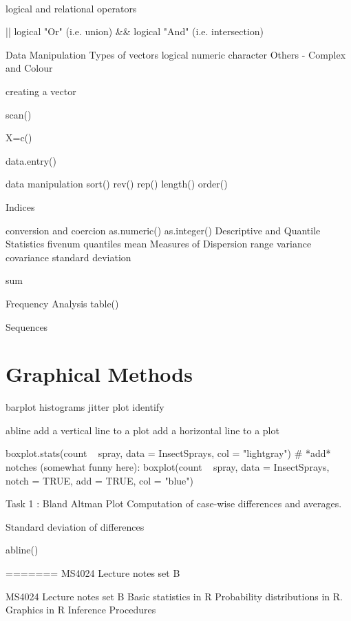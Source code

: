  \newpage



logical and relational operators
 
||      logical "Or"      (i.e.  union)
&&     logical "And"   (i.e. intersection)   

 



Data Manipulation
Types of vectors
	logical
	numeric
	character
    Others  - Complex and Colour

creating a vector

scan()

X=c()

data.entry()

data manipulation
sort()
rev()
rep()
length()
order()


Indices

 

 

 
conversion and coercion
as.numeric()
as.integer()
Descriptive and Quantile Statistics
fivenum
quantiles
mean
Measures of Dispersion
  range
  variance
  covariance
  standard deviation

sum

 
 

Frequency Analysis
table()
 
Sequences 
 



\section{Graphical Methods}

barplot
histograms
jitter
plot
identify

abline
add a vertical line to a plot
add a horizontal line to a plot
 
boxplot.stats(count ~ spray, data = InsectSprays, col = "lightgray")
# *add* notches (somewhat funny here):
boxplot(count ~ spray, data = InsectSprays,        notch = TRUE, add = TRUE, col = "blue")



 
Task 1 : Bland Altman Plot
Computation of case-wise differences and averages.
 
Standard deviation of differences
 
abline()
 
 

 
=======
MS4024 Lecture notes set B

MS4024 Lecture notes set B
Basic statistics in R
Probability distributions in R.
Graphics in R
Inference Procedures
 
